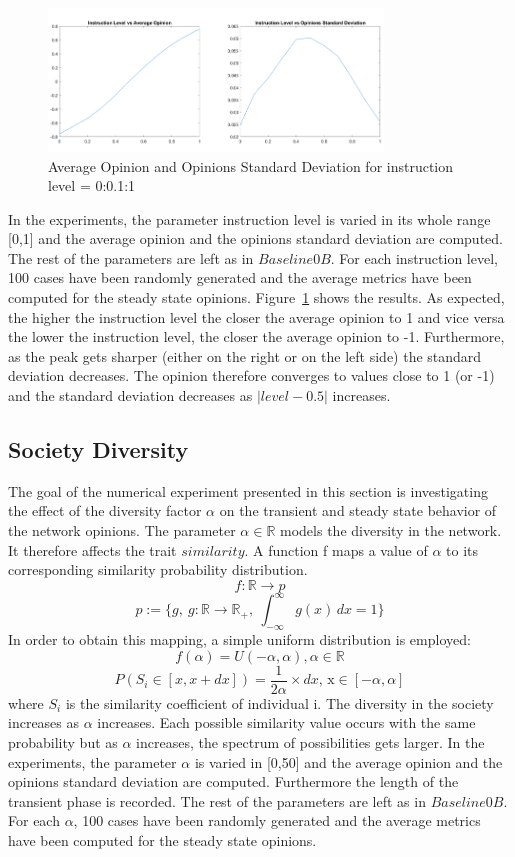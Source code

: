 \begin{figure}[!t]
	\centering
	\includegraphics[width=3.5in]{Figures/instruction_results.png}
	\caption{Average Opinion and Opinions Standard Deviation for instruction level = 0:0.1:1}
	\label{pics:critstatistics}
\end{figure}
In the experiments, the parameter instruction level is varied in its whole range [0,1] and the average opinion and the opinions standard deviation are computed. The rest of the parameters are left as in $Baseline0B$. For each instruction level, 100 cases have been randomly generated and the average metrics have been computed for the steady state opinions.
Figure~\ref{pics:critstatistics} shows the results. As expected, the higher the instruction level the closer the average opinion to 1 and vice versa the lower the instruction level, the closer the average opinion to -1. Furthermore, as the peak gets sharper (either on the right or on the left side) the standard deviation decreases. The opinion therefore converges to values close to 1 (or -1) and the standard deviation decreases as $|level-0.5|$ increases. 
\subsection{Society Diversity}
The goal of the numerical experiment presented in this section is investigating the effect of the diversity factor $\alpha$ on the transient and steady state behavior of the network opinions. The parameter $\alpha \in \mathbb{R}$ models the diversity in the network. It therefore affects the trait $similarity$.
A function f maps a value of $\alpha$ to its corresponding similarity probability distribution. 
$$
f: \mathbb{R} \to p 
$$
$$
p:= \{g,\ g: \mathbb{R} \to \mathbb{R}_+,\ \int_{-\infty}^{\infty} g(x) \,dx = 1\}
$$
In order to obtain this mapping, a simple uniform distribution is employed:
$$
f(\alpha) = U(-\alpha, \alpha), \alpha \in \mathbb{R}
$$
$$
P(S_i\in[x,x+dx]) =  \frac{1}{2\alpha} \times dx\text{, x}\in [-\alpha, \alpha]
$$
where $S_i$ is the similarity coefficient of individual i.
The diversity in the society increases as $\alpha$ increases. Each possible similarity value occurs with the same probability but as $\alpha$ increases, the spectrum of possibilities gets larger. \newline
In the experiments, the parameter $\alpha$ is varied in [0,50] and the average opinion and the opinions standard deviation are computed. Furthermore the length of the transient phase is recorded. The rest of the parameters are left as in $Baseline0B$. For each $\alpha$, 100 cases have been randomly generated and the average metrics have been computed for the steady state opinions. 

